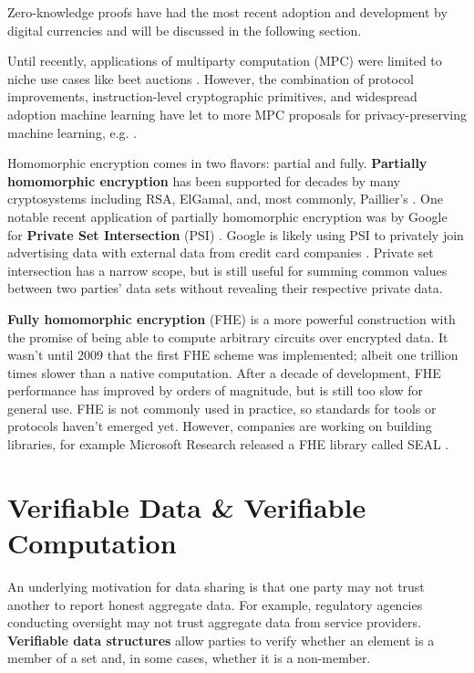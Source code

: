 \documentclass[nobib]{tufte-handout}
\begin{document}
Zero-knowledge proofs have had the most recent adoption and development by
digital currencies and will be discussed in the following section.

Until recently, applications of multiparty computation (MPC) were limited to
niche use cases like beet auctions \cite{DBLP:conf/fc/BogetoftCDGJKNNNPST09}.
However, the combination of protocol improvements, instruction-level
cryptographic primitives, and widespread adoption machine learning have let to
more MPC proposals for privacy-preserving machine learning, e.g.
\cite{DBLP:conf/ccs/BonawitzIKMMPRS17}.

Homomorphic encryption comes in two flavors: partial and fully.
\textbf{Partially homomorphic encryption} has been supported for decades by many
cryptosystems including RSA, ElGamal, and, most commonly, Paillier's
\cite{DBLP:conf/eurocrypt/Paillier99}. One notable recent application of
partially homomorphic encryption was by Google for \textbf{Private Set
Intersection} (PSI) \cite{google-psi}. Google is likely using PSI to privately
join advertising data with external data from credit card companies
\cite{google-mastercard}. Private set intersection has a narrow scope, but is
still useful for summing common values between two parties’ data sets without
revealing their respective private data.

\textbf{Fully homomorphic encryption} (FHE) is a more powerful construction with
the promise of being able to compute arbitrary circuits over encrypted data. It
wasn't until 2009 \cite{DBLP:conf/stoc/Gentry09} that the first FHE scheme was
implemented; albeit one trillion times slower than a native computation. After a
decade of development, FHE performance has improved by orders of magnitude, but
is still too slow for general use. FHE is not commonly used in practice, so
standards for tools or protocols haven't emerged yet. However, companies
are working on building libraries, for example Microsoft Research released a FHE library
called SEAL \cite{sealcrypto}.

\section{Verifiable Data \& Verifiable Computation}
\label{verifiable}

An underlying motivation for data sharing is that one party may not trust
another to report honest aggregate data. For example, regulatory agencies
conducting oversight may not trust aggregate data from service providers.
\textbf{Verifiable data structures} allow parties to verify whether an element
is a member of a set and, in some cases, whether it is a non-member.
\end{document}
